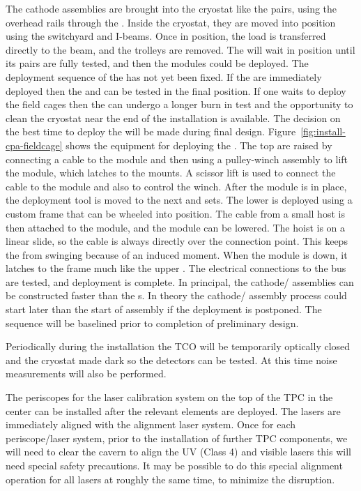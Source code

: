 The cathode  assemblies are brought into the cryostat like the  pairs, using the overhead rails through the . Inside the cryostat, they are moved into position using the  switchyard and  I-beams. 
Once in position, the load is transferred directly to the  beam, and the trolleys are removed. 
The  will wait in position until its  pairs are fully tested, and then the  modules could be deployed. 
The deployment sequence of the  has not yet been fixed. 
If the  are immediately deployed then the  and  can be tested in the final position. 
If one waits to deploy the field cages then the  can undergo a longer burn in test and the opportunity to clean the cryostat near the end of the installation is available. The decision on the best time to deploy the  will be made during final design.
Figure~\ref{fig:install-cpa-fieldcage} shows the equipment for deploying the . 
The top  are raised by connecting a cable to the module and then using a pulley-winch assembly to lift the module, which latches to the  mounts. 
A scissor lift is used to connect the cable to the module and also to control the winch. 
After the module is in place, the deployment tool is moved to the next and  sets. 
The lower  is deployed using a custom frame that can be wheeled into position. 
The cable from a small host is then attached to the  module, and the module can be lowered. 
The hoist is on a linear slide, so the cable is always directly over the connection point. 
This keeps the  from swinging because of an induced moment. 
When the module is down, it latches to the  frame much like the upper . 
The electrical connections to the  bus are tested, and deployment is complete. 
In principal, the cathode/ assemblies can be constructed faster than the s. 
In theory the cathode/ assembly process could start later than the start of  assembly if the deployment is postponed. The sequence will be baselined prior to completion of preliminary design.

Periodically during the  installation the TCO will be temporarily optically closed and the cryostat made dark so the  detectors can be tested. At this time noise measurements will also be performed.

The periscopes for the laser calibration system on the top of the TPC in the center can be installed after the relevant  elements are deployed. The lasers are immediately aligned with the alignment laser system. 
Once for each periscope/laser system, prior to the installation of further TPC components, we will need to clear the cavern to align the UV (Class 4) and visible lasers this will need special safety precautions. 
It may be possible to do this special alignment operation for all lasers at roughly the same time, to minimize the disruption.

